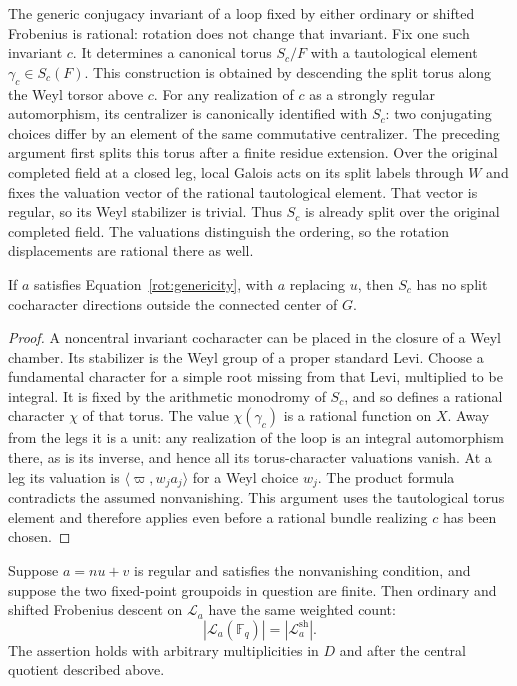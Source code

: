 The generic conjugacy invariant of a loop fixed by either ordinary or
shifted Frobenius is rational: rotation does not change that invariant.
Fix one such invariant $c$.  It determines a canonical torus $S_c/F$
with a tautological element $\gamma_c\in S_c(F)$.  This construction is
obtained by descending the split torus along the Weyl torsor above $c$.
For any realization of $c$ as a strongly regular automorphism, its
centralizer is canonically identified with $S_c$: two conjugating
choices differ by an element of the same commutative centralizer.
The preceding argument first splits this torus after a finite residue
extension.  Over the original completed field at a closed leg, local
Galois acts on its split labels through $W$ and fixes the valuation
vector of the rational tautological element.  That vector is regular,
so its Weyl stabilizer is trivial.  Thus $S_c$ is already split over the
original completed field.  The valuations distinguish the ordering,
so the rotation displacements are rational there as well.

\begin{lemma}\label{rot:anisotropic}
If $a$ satisfies Equation~\eqref{rot:genericity}, with $a$ replacing $u$,
then $S_c$ has no split cocharacter directions outside the connected
center of $G$.
\end{lemma}

\begin{proof}
A noncentral invariant cocharacter can be placed in the closure of a
Weyl chamber.  Its stabilizer is the Weyl group of a proper standard
Levi.  Choose a fundamental character for a simple root missing from
that Levi, multiplied to be integral.  It is fixed by the arithmetic
monodromy of $S_c$, and so defines a rational character $\chi$ of that
torus.  The value $\chi(\gamma_c)$ is a rational function on $X$.
Away from the legs it is a unit: any realization of the loop is an
integral automorphism there, as is its inverse, and hence all its
torus-character valuations vanish.  At a leg its valuation is
$\langle\varpi,w_ja_j\rangle$ for a Weyl choice $w_j$.  The product
formula contradicts the assumed nonvanishing.  This argument uses
the tautological torus element and therefore applies even before a
rational bundle realizing $c$ has been chosen.
\end{proof}

\begin{lemma}\label{rot:picard}
Suppose $a=nu+v$ is regular and satisfies the nonvanishing condition,
and suppose the two fixed-point groupoids in question are finite.
Then ordinary and shifted Frobenius descent on $\mathcal L_a$ have
the same weighted count:
\begin{equation}\label{rot:descent-count}
 |\mathcal L_a(\mathbb F_q)|=|\mathcal L_a^{\mathrm{sh}}|.
\end{equation}
The assertion holds with arbitrary multiplicities in $D$ and after
the central quotient described above.
\end{lemma}

